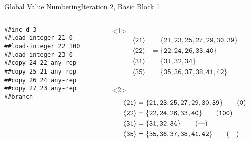 \documentclass{beamer}
\newcommand{\vn}[1]{\ensuremath{\langle\texttt{#1}\rangle}}
\newcommand{\vreg}[1]{\texttt{#1}}
\begin{document}
\begin{frame}[fragile]{Global Value Numbering}{Iteration 2, Basic Block 1}
  \footnotesize
  \begin{columns}[t,onlytextwidth]
    \begin{column}[t]{.5\textwidth}
      \begin{Verbatim}[frame=single]
##inc-d 3
##load-integer 21 0
##load-integer 22 100
##load-integer 23 0
##copy 24 22 any-rep
##copy 25 21 any-rep
##copy 26 24 any-rep
##copy 27 23 any-rep
##branch
      \end{Verbatim}
    \end{column}
    \begin{column}{.5\textwidth}
      \begin{onlyenv}<1>
        \begin{align*}
          \vn{21} &= \{\vreg{21},
                       \vreg{23},
                       \vreg{25},
                       \vreg{27},
                       \vreg{29},
                       \vreg{30},
                       \vreg{39}\} \tag{---} \\
          \vn{22} &= \{\vreg{22},
                       \vreg{24},
                       \vreg{26},
                       \vreg{33},
                       \vreg{40}\} \tag{---} \\
          \vn{31} &= \{\vreg{31},
                       \vreg{32},
                       \vreg{34}\} \tag{---} \\
          \vn{35} &= \{\vreg{35},
                       \vreg{36},
                       \vreg{37},
                       \vreg{38},
                       \vreg{41},
                       \vreg{42}\} \tag{---}
        \end{align*}
      \end{onlyenv}
      \begin{onlyenv}<2>
        \begin{align*}
          \vn{21} &= \{\vreg{21},
                       \vreg{23},
                       \vreg{25},
                       \vreg{27},
                       \vreg{29},
                       \vreg{30},
                       \vreg{39}\} \tag{\texttt{0}} \\
          \vn{22} &= \{\vreg{22},
                       \vreg{24},
                       \vreg{26},
                       \vreg{33},
                       \vreg{40}\} \tag{\texttt{100}} \\
          \vn{31} &= \{\vreg{31},
                       \vreg{32},
                       \vreg{34}\} \tag{---} \\
          \vn{35} &= \{\vreg{35},
                       \vreg{36},
                       \vreg{37},
                       \vreg{38},
                       \vreg{41},
                       \vreg{42}\} \tag{---}
        \end{align*}
      \end{onlyenv}
    \end{column}
  \end{columns}
\end{frame}
\end{document}
